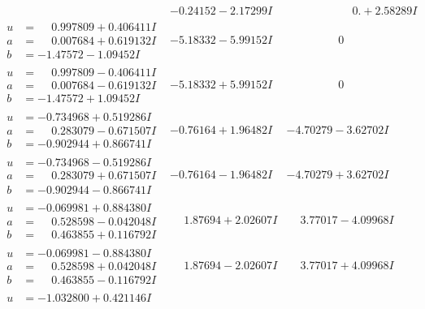 \documentclass[1p]{elsarticle_modified}
\theoremstyle{definition}
\begin{document}
$$\begin{array}{c|c|c}
 & -0.24152 - 2.17299 I & \phantom{-0.000000 -}0. + 2.58289 I \\ \hline\begin{aligned}
u &= \phantom{-}0.997809 + 0.406411 I \\
a &= \phantom{-}0.007684 + 0.619132 I \\
b &= -1.47572 - 1.09452 I\end{aligned}
 & -5.18332 - 5.99152 I & \phantom{-0.000000 } 0 \\ \hline\begin{aligned}
u &= \phantom{-}0.997809 - 0.406411 I \\
a &= \phantom{-}0.007684 - 0.619132 I \\
b &= -1.47572 + 1.09452 I\end{aligned}
 & -5.18332 + 5.99152 I & \phantom{-0.000000 } 0 \\ \hline\begin{aligned}
u &= -0.734968 + 0.519286 I \\
a &= \phantom{-}0.283079 - 0.671507 I \\
b &= -0.902944 + 0.866741 I\end{aligned}
 & -0.76164 + 1.96482 I & -4.70279 - 3.62702 I \\ \hline\begin{aligned}
u &= -0.734968 - 0.519286 I \\
a &= \phantom{-}0.283079 + 0.671507 I \\
b &= -0.902944 - 0.866741 I\end{aligned}
 & -0.76164 - 1.96482 I & -4.70279 + 3.62702 I \\ \hline\begin{aligned}
u &= -0.069981 + 0.884380 I \\
a &= \phantom{-}0.528598 - 0.042048 I \\
b &= \phantom{-}0.463855 + 0.116792 I\end{aligned}
 & \phantom{-}1.87694 + 2.02607 I & \phantom{-}3.77017 - 4.09968 I \\ \hline\begin{aligned}
u &= -0.069981 - 0.884380 I \\
a &= \phantom{-}0.528598 + 0.042048 I \\
b &= \phantom{-}0.463855 - 0.116792 I\end{aligned}
 & \phantom{-}1.87694 - 2.02607 I & \phantom{-}3.77017 + 4.09968 I \\ \hline\begin{aligned}
u &= -1.032800 + 0.421146 I \\

\end{aligned}
\end{array}$$
\end{document}
